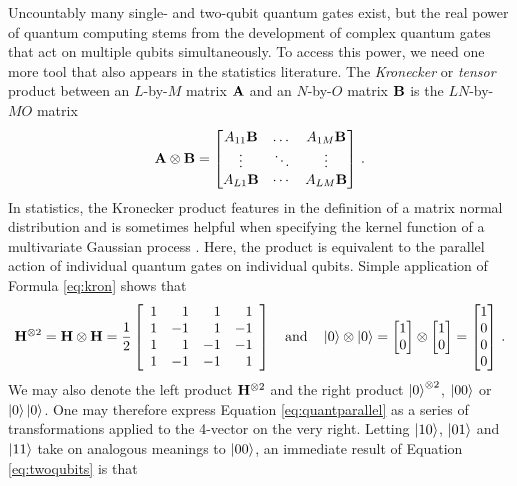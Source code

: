 \documentclass[12pt]{article} %
\begin{document}
Uncountably many single- and two-qubit quantum gates exist, but the real power of quantum computing stems from the development of complex quantum gates that act on multiple qubits simultaneously.   To access this power, we need one more tool that also appears in the statistics literature.  The \emph{Kronecker} or \emph{tensor} product between an $L$-by-$M$ matrix $\mathbf{A}$ and an $N$-by-$O$ matrix $\mathbf{B}$ is the $LN$-by-$MO$ matrix
\begin{align}\label{eq:kron}
	\mathbf{A} \otimes \mathbf{B} = \begin{bmatrix}
		A_{11} \mathbf{B} & \dots & A_{1M} \mathbf{B} \\
		\vdots & \ddots & \vdots \\
		A_{L1}\mathbf{B} & \cdots & A_{LM}  \mathbf{B}
	\end{bmatrix} \, .
\end{align} 
In statistics, the Kronecker product features in the definition of a matrix normal distribution and is sometimes helpful when specifying the kernel function of a multivariate Gaussian process \citep{werner2008estimation}. Here, the product is equivalent to the parallel action of individual quantum gates on individual qubits.  Simple application of Formula \eqref{eq:kron} shows that
\begin{align}\label{eq:twoqubits}
	\mathbf{H}^{\otimes 2} =\mathbf{H} \otimes \mathbf{H} = \frac{1}{2} \left[\begin{array}{rrrr}
		1 & 1 & 1 & 1 \\
		1 &  -1& 1 & -1 \\
		1 & 1 & -1 & -1 \\
		1 & -1 & -1 & 1
	\end{array}\right] \quad \mbox{and} \quad \ket{0}\otimes\ket{0}=\begin{bmatrix}
		1 \\ 0
	\end{bmatrix} \otimes \begin{bmatrix}
		1 \\ 0
	\end{bmatrix} = \begin{bmatrix}
		1 \\ 0 \\ 0 \\ 0
	\end{bmatrix} \, .
\end{align} 
We may also denote the left product $\mathbf{H}^{\otimes2}$ and the right product $\ket{0}^{\otimes2}$, $\ket{00}$ or $\ket{0}\ket{0}$. One may therefore express Equation \eqref{eq:quantparallel} as a series of transformations applied to the 4-vector on the very right. Letting $\ket{10}$, $\ket{01}$ and $\ket{11}$ take on analogous meanings to $\ket{00}$, an immediate result of Equation \eqref{eq:twoqubits} is that
\end{document}
